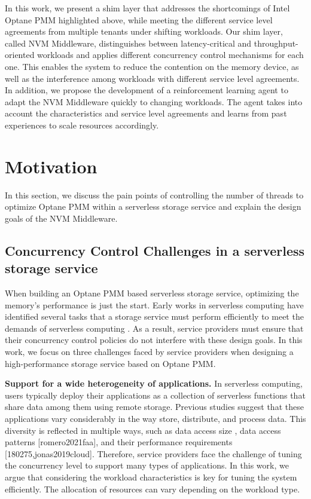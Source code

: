 In this work, we present a shim layer that addresses the shortcomings of Intel Optane PMM highlighted above, while meeting the different service level agreements from multiple tenants under shifting workloads. Our shim layer, called NVM Middleware, distinguishes between latency-critical and throughput-oriented workloads and applies different concurrency control mechanisms for each one. This enables the system to reduce the contention on the memory device, as well as the interference among workloads with different service level agreements. In addition, we propose the development of a reinforcement learning agent to adapt the NVM Middleware quickly to changing workloads. The agent takes into account the characteristics and service level agreements and learns from past experiences to scale resources accordingly.


\section{Motivation}
In this section, we discuss the pain points of controlling the number of threads to optimize Optane PMM within a serverless storage service and explain the design goals of the NVM Middleware.

\subsection{Concurrency Control Challenges in a serverless storage service}

When building an Optane PMM based serverless storage service, optimizing the memory’s performance is just the start. Early works in serverless computing have identified several tasks that a storage service must perform efficiently to meet the demands of serverless computing \cite{180275,jonas2019cloud,klimovic2018understanding,klimovic2018pocket,wu2019autoscaling,romero2021faa}. As a result, service providers must ensure that their concurrency control policies do not interfere with these design goals. In this work, we focus on three challenges faced by service providers when designing a high-performance storage service based on Optane PMM.

\textbf{Support for a wide heterogeneity of applications.} In serverless computing, users typically deploy their applications as a collection of serverless functions that share data among them using remote storage. Previous studies suggest that these applications vary considerably in the way store, distribute, and process data. This diversity is reflected in multiple ways, such as data access size \cite{klimovic2018pocket,romero2021faa}, data access patterns [romero2021faa], and their performance requirements [180275,jonas2019cloud]. Therefore, service providers face the challenge of tuning the concurrency level to support many types of applications. In this work, we argue that considering the workload characteristics is key for tuning the system efficiently. The allocation of resources can vary depending on the workload type.

